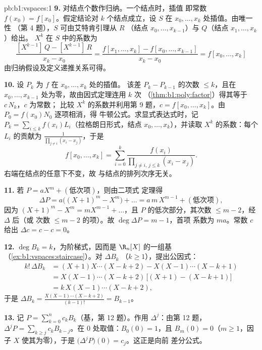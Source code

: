 \begin{solution}{pb:b1:vspaces:1}
\textbf{9.} 对结点个数作归纳。一个结点时，插值
即常数 $f(x_0) = f[x_0]$。假定结论对
$k$ 个结点成立，设 $S$ 在 $x_0, \dots, x_k$ 处插值。由唯一性
（第 4 题），$S$ 可由艾特肯引理从 $R$
（结点 $x_0, \dots, x_{k-1}$）与 $Q$（结点 $x_1, \dots, x_k$）给出。
$X^{k}$ 在 $S$ 中的系数为
\[
\frac{[X^{k-1}]\,Q - [X^{k-1}]\,R}{x_k - x_0}
= \frac{f[x_1, \dots, x_k] - f[x_0, \dots, x_{k-1}]}{x_k - x_0}
= f[x_0, \dots, x_k]
\]
由归纳假设及定义递推关系可得。

\textbf{10.} 设 $P_k$ 为 $f$ 在 $x_0, \dots, x_k$ 处的插值。
该差 $P_k - P_{k-1}$ 的次数 $\leq k$，且在
$x_0, \dots, x_{k-1}$ 处为零，故由因式定理连用 $k$ 次
（\cref{thm:b1:poly:factor}）得其等于 $c\,N_k$，$c$ 为常数；
比较 $X^{k}$ 的系数并利用第 9 题，$c =
f[x_0, \dots, x_k]$。由 $P_0 = f(x_0) N_0$ 逐项相消，得
牛顿公式。求显式表达式时，记 $P_k = \sum_{i \leq
k} f(x_i) L_i$（拉格朗日形式，结点 $x_0, \dots, x_k$），并读取
$X^{k}$ 的系数：每个 $L_i$ 的贡献为
$\frac{1}{\prod_{j \neq i}(x_i - x_j)}$，于是
\[
f[x_0, \dots, x_k] = \sum_{i=0}^{k}
\frac{f(x_i)}{\prod_{j \neq i,\, j \leq k}(x_i - x_j)} .
\]
右端在结点的任意下不变，故
与结点的排列次序无关。

\textbf{11.} 若 $P = a X^m + (\text{低次项})$，则由二项式
定理得
\[
\Delta P = a\bigl((X+1)^m - X^m\bigr) + \dots
= a\,m\,X^{m-1} + (\text{低次项}),
\]
因为 $(X+1)^m - X^m = m X^{m-1} + \dots$，且
$P$ 的低次部分，其次数 $\leq m - 2$，经 $\Delta$ 后（或
次数 $\leq m-2$ 的项）。故 $\deg \Delta P = m - 1$，首项
系数为 $m a$。常数 $c$ 给出 $\Delta c = c - c = 0$。

\textbf{12.} $\deg B_k = k$，为阶梯式，因而是
$\R_n[X]$ 的一组基（\cref{ex:b1:vspaces:staircase}）。对 $\Delta B_k$
（$k \geq 1$），提出公因式：
\begin{align*}
k!\,\Delta B_k
&= (X+1)X\cdots(X-k+2) - X(X-1)\cdots(X-k+1) \\
&= X(X-1)\cdots(X-k+2)\,\bigl[(X+1) - (X-k+1)\bigr] \\
&= k\,X(X-1)\cdots(X-k+2),
\end{align*}
于是 $\Delta B_k = \frac{X(X-1)\cdots(X-k+2)}{(k-1)!} = B_{k-1}$。

\textbf{13.} 记 $P = \sum_{k=0}^{n} c_k B_k$（基，第
12 题）。作用 $\Delta^{j}$：由第 12 题，$\Delta^{j} P = \sum_{k
\geq j} c_k B_{k-j}$。在 $0$ 处取值：$B_0(0) = 1$，且 $B_m(0) =
0$（$m \geq 1$，因子 $X$ 使其为零），于是
$\bigl(\Delta^{j}P\bigr)(0) = c_j$。这正是向前
差分公式。


\end{solution}
